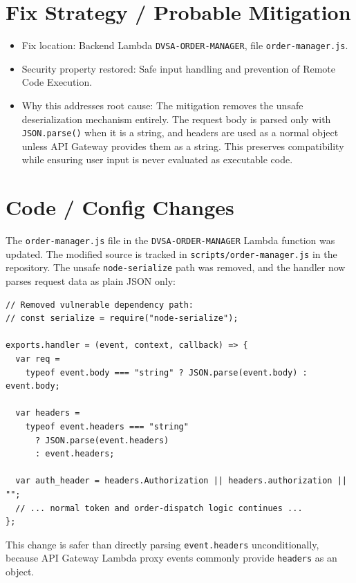\documentclass[12pt]{report}
\begin{document}
\section{Fix Strategy / Probable Mitigation}
\begin{itemize}
  \item Fix location: Backend Lambda \nolinkurl{DVSA-ORDER-MANAGER}, file \nolinkurl{order-manager.js}.
  \item Security property restored: Safe input handling and prevention of Remote Code Execution.
  \item Why this addresses root cause: The mitigation removes the unsafe deserialization mechanism entirely. The request body is parsed only with \texttt{JSON.parse()} when it is a string, and headers are used as a normal object unless API Gateway provides them as a string. This preserves compatibility while ensuring user input is never evaluated as executable code.
\end{itemize}

\section{Code / Config Changes}
The \nolinkurl{order-manager.js} file in the \nolinkurl{DVSA-ORDER-MANAGER} Lambda function was updated. The modified source is tracked in \texttt{scripts/order-manager.js} in the repository. The unsafe \texttt{node-serialize} path was removed, and the handler now parses request data as plain JSON only:

\begin{lstlisting}[style=reportcode]
// Removed vulnerable dependency path:
// const serialize = require("node-serialize");

exports.handler = (event, context, callback) => {
  var req =
    typeof event.body === "string" ? JSON.parse(event.body) : event.body;

  var headers =
    typeof event.headers === "string"
      ? JSON.parse(event.headers)
      : event.headers;

  var auth_header = headers.Authorization || headers.authorization || "";
  // ... normal token and order-dispatch logic continues ...
};
\end{lstlisting}

This change is safer than directly parsing \texttt{event.headers} unconditionally, because API Gateway Lambda proxy events commonly provide \texttt{headers} as an object.
\end{document}
